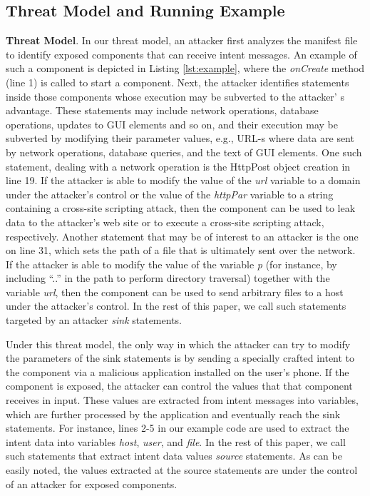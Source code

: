 \subsection{Threat Model and Running Example}
\textbf{Threat Model}. In our threat model, an attacker first analyzes the manifest file to identify exposed components that can receive intent messages. An example of such a component is depicted in Listing \ref{lst:example}, where the \textit{onCreate} method (line 1) is called to start a component. Next, the attacker identifies statements inside those components whose execution may be subverted to the attacker' s advantage. These statements may include network operations, database operations, updates to GUI elements and so on, and their execution may be subverted by modifying their parameter values, e.g., URL-s where data are sent by network operations, database queries, and the text of GUI elements. One such statement, dealing with a network operation is the HttpPost object creation in line 19. If the attacker is able to modify the value of the \textit{url} variable to a domain under the attacker's control or the value of the \textit{httpPar} variable to a string containing a cross-site scripting attack, then the component can be used to leak data to the attacker's web site or to execute a cross-site scripting attack, respectively. Another statement that may be of interest to an attacker is the one on line 31, which sets the path of a file that is ultimately sent over the network. If the attacker is able to modify the value of the variable \textit{p} (for instance, by including ``..'' in the path to perform directory traversal) together with the variable \textit{url}, then the component can be used to send arbitrary files to a host under the attacker's control. 
In the rest of this paper, we call such statements targeted by an attacker \textit{sink} statements.

Under this threat model, the only way in which the attacker can try to modify the parameters of the sink statements is by sending a specially crafted intent to the component via a malicious application installed on the user's phone. If the component is exposed, the attacker can control the values that that component receives in input. These values are extracted from intent messages into variables, which are further processed by the application and eventually reach the sink statements. For instance, lines 2-5 in our example code are used to extract the intent data into variables \textit{host}, \textit{user}, and \textit{file}. In the rest of this paper, we call such statements that extract intent data values \textit{source} statements. As can be easily noted, the values extracted at the source statements are under the control of an attacker for exposed components.

